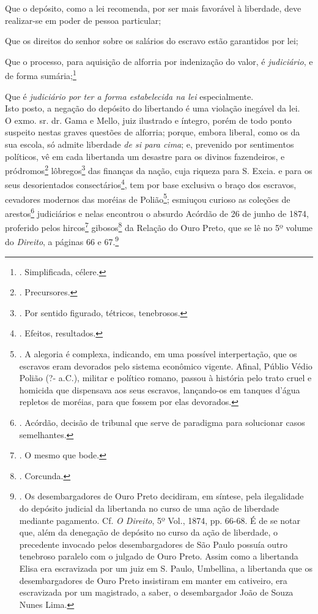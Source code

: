 Que o depósito, como a lei recomenda, por ser mais favorável à
liberdade, deve realizar-se em poder de pessoa particular;

Que os direitos do senhor sobre os salários do escravo estão garantidos
por lei;

Que o processo, para aquisição de alforria por indenização do valor, é
\emph{judiciário}, e de forma sumária;\footnote{. Simplificada, célere.}

Que é \emph{judiciário por ter a forma estabelecida na lei}
especialmente.\\
Isto posto, a negação do depósito do libertando é uma violação inegável
da lei.\\
O exmo. sr. dr. Gama e Mello, juiz ilustrado e íntegro, porém de todo
ponto suspeito nestas graves questões de alforria; porque, embora
liberal, como os da sua escola, só admite liberdade \emph{de si para
cima}; e, prevenido por sentimentos políticos, vê em cada libertanda um
desastre para os divinos fazendeiros, e pródromos\footnote{.
  Precursores.} lôbregos\footnote{. Por sentido figurado, tétricos,
  tenebrosos.} das finanças da nação, cuja riqueza para S. Excia. e para
os seus desorientados consectários\footnote{. Efeitos, resultados.}, tem
por base exclusiva o braço dos escravos, cevadores modernos das moréias
de Polião\footnote{. A alegoria é complexa, indicando, em uma possível
  interpertação, que os escravos eram devorados pelo sistema econômico
  vigente. Afinal, Públio Védio Polião (?- a.C.), militar e político
  romano, passou à história pelo trato cruel e homicida que dispensava
  aos seus escravos, lançando-os em tanques d'água repletos de moréias,
  para que fossem por elas devorados.}; esmiuçou curioso as coleções de
arestos\footnote{. Acórdão, decisão de tribunal que serve de paradigma
  para solucionar casos semelhantes.} judiciários e nelas encontrou o
absurdo Acórdão de 26 de junho de 1874, proferido pelos hircos\footnote{.
  O mesmo que bode.} gibosos\footnote{. Corcunda.} da Relação do Ouro
Preto, que se lê no 5º volume do \emph{Direito}, a páginas 66 e
67.\footnote{. Os desembargadores de Ouro Preto decidiram, em síntese,
  pela ilegalidade do depósito judicial da libertanda no curso de uma
  ação de liberdade mediante pagamento. Cf. \emph{O Direito}, 5º Vol.,
  1874, pp. 66-68. É de se notar que, além da denegação de depósito no
  curso da ação de liberdade, o precedente invocado pelos
  desembargadores de São Paulo possuía outro tenebroso paralelo com o
  julgado de Ouro Preto. Assim como a libertanda Elisa era escravizada
  por um juiz em S. Paulo, Umbellina, a libertanda que os
  desembargadores de Ouro Preto insistiram em manter em cativeiro, era
  escravizada por um magistrado, a saber, o desembargador João de Souza
  Nunes Lima.}

